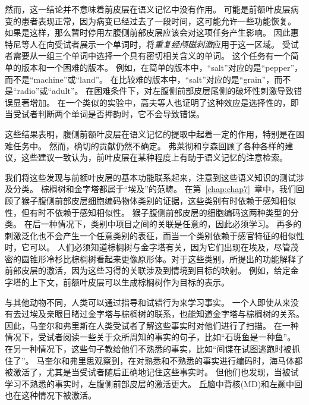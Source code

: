 然而，这一结论并不意味着前皮层在语义记忆中没有作用。
可能是前额叶皮层病变的患者表现正常，因为病变已经过去了一段时间，这可能允许一些功能恢复。
如果是这样，那么暂时停用左腹侧前部皮层应该会对这项任务产生影响。
因此惠特尼等人\cite{whitney2011neural}在向受试者展示一个单词时，将\textit{重复经颅磁刺激}应用于这一区域。
受试者需要从一组三个单词中选择一个具有密切相关含义的单词。
这个任务有一个简单的版本和一个困难的版本。
例如，在简单的版本中，“salt”对应的是“pepper”，而不是“machine”或“land”。
在比较难的版本中，“salt”对应的是“grain”，而不是“radio”或“adult”。
在困难条件下，对左腹侧前部皮层尾侧的破坏性刺激导致错误显著增加。
在一个类似的实验中，高夫等人\cite{gough2005dissociating}也证明了这种效应是选择性的，即当受试者判断两个单词是否押韵时，它不会导致错误。
\par


这些结果表明，腹侧前额叶皮层在语义记忆的提取中起着一定的作用，特别是在困难任务中。
然而，确切的贡献仍然不确定。
弗莱彻和亨森\cite{fletcher2001frontal}回顾了各种各样的建议，这些建议一致认为，前叶皮层在某种程度上有助于语义记忆的注意检索。
\par


我们将这些发现与前额叶皮层的基本功能联系起来，注意到这些语义知识的测试涉及分类。
棕榈树和金字塔都属于“埃及”的范畴。
在第~\ref{chap:chap7}~章中，我们回顾了猴子腹侧前部皮层细胞编码物体类别的证据，这些类别有时依赖于感知相似性，但有时不依赖于感知相似性。
猴子腹侧前部皮层的细胞编码这两种类型的分类。
在后一种情况下，类别中项目之间的关联是任意的，因此必须学习。
再多的刺激泛化也不会产生一个任意类别的表征，而当一个类别依赖于感官特征的相似性时，它可以。
人们必须知道棕榈树与金字塔有关，因为它们出现在埃及，尽管茂密的圆锥形冷杉比棕榈树看起来更像原形体。对于这些类别，所提出的功能解释了前部皮层的激活，因为这些习得的关联涉及到情境到目标的映射。
例如，给定金字塔的上下文，前额叶皮层可以生成棕榈树作为目标的表示。
\par


与其他动物不同，人类可以通过指导和试错行为来学习事实。
一个人即使从来没有去过埃及亲眼目睹过金字塔与棕榈树的联系，也能知道金字塔与棕榈树的关系。
因此，马奎尔和弗里斯\cite{maguire2004brain}在人类受试者了解这些事实时对他们进行了扫描。
在一种情况下，受试者阅读一些关于众所周知的事实的句子，比如“石斑鱼是一种鱼”。
在另一种情况下，这些句子教给他们不熟悉的事实，比如“间谍在试图逃跑时被抓住了”。
马奎尔和弗里思观察到，在对熟悉和不熟悉的事实进行编码时，海马体都被激活了，尤其是当受试者随后正确地记住这些事实时。
但他们也发现，当被试学习不熟悉的事实时，左腹侧前部皮层的激活更大。
丘脑中背核(MD)和左颞中回也在这种情况下被激活。
\par



